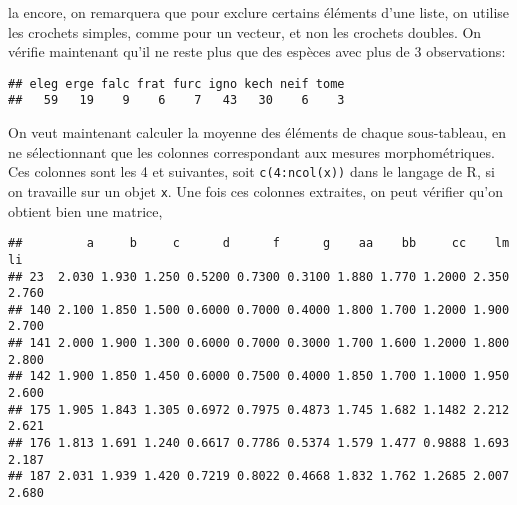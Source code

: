 \noindent la encore, on remarquera que pour exclure certains éléments d'une liste, on utilise les crochets simples, comme pour un vecteur, et non les crochets doubles.
On vérifie maintenant qu'il ne reste plus que des espèces avec plus de 3 observations:

\begin{knitrout}
\color{fgcolor}\begin{kframe}
\begin{flushleft}
\ttfamily\noindent
{}\hlkeyword{(}\hlkeyword{(}\hlkeyword{,}{\ }\hlkeyword{)}\hlkeyword{)}\mbox{}
\normalfont
\end{flushleft}
\begin{verbatim}
## eleg erge falc frat furc igno kech neif tome 
##   59   19    9    6    7   43   30    6    3 
\end{verbatim}
\end{kframe}
\end{knitrout}


On veut maintenant calculer la moyenne des éléments de chaque sous-tableau, en ne sélectionnant que les colonnes correspondant aux mesures morphométriques.
Ces colonnes sont les 4 et suivantes, soit \texttt{c(4:ncol(x))} dans le langage de R, si on travaille sur un objet \texttt{x}.
Une fois ces colonnes extraites, on peut vérifier qu'on obtient bien une matrice,

\begin{knitrout}
\color{fgcolor}\begin{kframe}
\begin{flushleft}
\ttfamily\noindent
{}\hlkeyword{\usebox{\hlnormalsizeboxdollar}}\hlkeyword{[}\hlkeyword{,}{\ }\hlkeyword{(}\hlkeyword{:}\hlkeyword{(}\hlkeyword{\usebox{\hlnormalsizeboxdollar}}\hlkeyword{)}\hlkeyword{)}\hlkeyword{]}\mbox{}
\normalfont
\end{flushleft}
\begin{verbatim}
##         a     b     c      d      f      g    aa    bb     cc    lm    li
## 23  2.030 1.930 1.250 0.5200 0.7300 0.3100 1.880 1.770 1.2000 2.350 2.760
## 140 2.100 1.850 1.500 0.6000 0.7000 0.4000 1.800 1.700 1.2000 1.900 2.700
## 141 2.000 1.900 1.300 0.6000 0.7000 0.3000 1.700 1.600 1.2000 1.800 2.800
## 142 1.900 1.850 1.450 0.6000 0.7500 0.4000 1.850 1.700 1.1000 1.950 2.600
## 175 1.905 1.843 1.305 0.6972 0.7975 0.4873 1.745 1.682 1.1482 2.212 2.621
## 176 1.813 1.691 1.240 0.6617 0.7786 0.5374 1.579 1.477 0.9888 1.693 2.187
## 187 2.031 1.939 1.420 0.7219 0.8022 0.4668 1.832 1.762 1.2685 2.007 2.680
\end{verbatim}
\end{kframe}
\end{knitrout}


